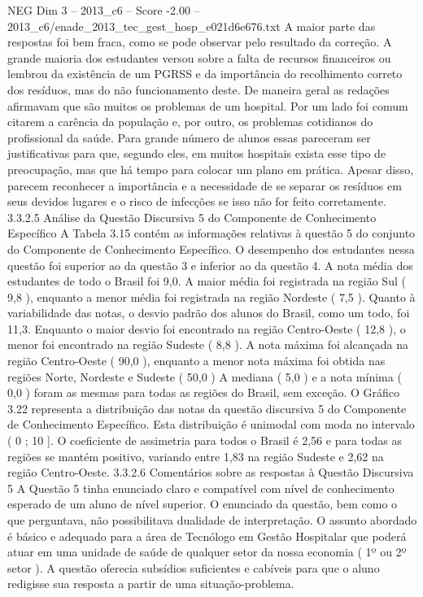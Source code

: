 \begin{textsample}{NEG Dim 3 – 2013\_c6 – Score -2.00 – 2013\_c6/enade\_2013\_tec\_gest\_hosp\_e021d6e676.txt}
A maior parte das respostas foi bem fraca, como se pode observar pelo resultado da correção.
A grande maioria dos estudantes versou sobre a falta de recursos financeiros ou lembrou da existência de um PGRSS e da importância do recolhimento correto dos resíduos, mas do não funcionamento deste.
De maneira geral as redações afirmavam que são muitos os problemas de um hospital.
Por um lado foi comum citarem a carência da população e, por outro, os problemas cotidianos do profissional da saúde.
Para grande número de alunos essas pareceram ser justificativas para que, segundo eles, em muitos hospitais exista esse tipo de preocupação, mas que há tempo para colocar um plano em prática.
Apesar disso, parecem reconhecer a importância e a necessidade de se separar os resíduos em seus devidos lugares e o risco de infecções se isso não for feito corretamente. 3.3.2.5 Análise da Questão Discursiva 5 do Componente de Conhecimento Específico A Tabela 3.15 contém as informações relativas à questão 5 do conjunto do Componente de Conhecimento Específico.
O desempenho dos estudantes nessa questão foi superior ao da questão 3 e inferior ao da questão 4.
A nota média dos estudantes de todo o Brasil foi 9,0.
A maior média foi registrada na região Sul ( 9,8 ), enquanto a menor média foi registrada na região Nordeste ( 7,5 ).
Quanto à variabilidade das notas, o desvio padrão dos alunos do Brasil, como um todo, foi 11,3.
Enquanto o maior desvio foi encontrado na região Centro-Oeste ( 12,8 ), o menor foi encontrado na região Sudeste ( 8,8 ).
A nota máxima foi alcançada na região Centro-Oeste ( 90,0 ), enquanto a menor nota máxima foi obtida nas regiões Norte, Nordeste e Sudeste ( 50,0 ) A mediana ( 5,0 ) e a nota mínima ( 0,0 ) foram as mesmas para todas as regiões do Brasil, sem exceção.
O Gráfico 3.22 representa a distribuição das notas da questão discursiva 5 do Componente de Conhecimento Específico.
Esta distribuição é unimodal com moda no intervalo ( 0 ; 10 ].
O coeficiente de assimetria para todos o Brasil é 2,56 e para todas as regiões se mantém positivo, variando entre 1,83 na região Sudeste e 2,62 na região Centro-Oeste. 3.3.2.6 Comentários sobre as respostas à Questão Discursiva 5 A Questão 5 tinha enunciado claro e compatível com nível de conhecimento esperado de um aluno de nível superior.
O enunciado da questão, bem como o que perguntava, não possibilitava dualidade de interpretação.
O assunto abordado é básico e adequado para a área de Tecnólogo em Gestão Hospitalar que poderá atuar em uma unidade de saúde de qualquer setor da nossa economia ( 1º ou 2º setor ).
A questão oferecia subsídios suficientes e cabíveis para que o aluno redigisse sua resposta a partir de uma situação-problema.

\end{textsample}
